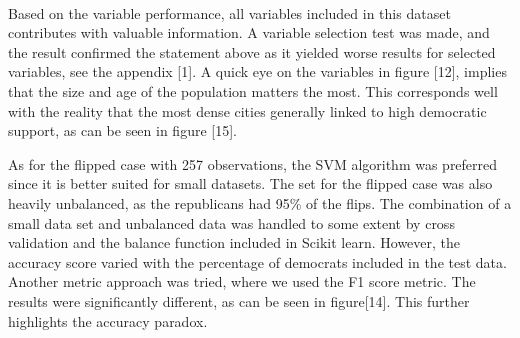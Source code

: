 \\
\par
Based on the variable performance, all variables included in this dataset contributes with valuable information. A variable selection test was made, and the result confirmed the statement above as it yielded worse results for selected variables, see the appendix [1]. A quick eye on the variables in figure [12], implies that the size and age of the population matters the most. This corresponds well with the reality that the most dense cities generally linked to high democratic support, as can be seen in figure [15].
\\
\par
As for the flipped case with 257 observations, the SVM algorithm was preferred since it is better suited for small datasets. The set for the flipped case was also heavily unbalanced, as the republicans had 95\% of the flips. The combination of a small data set and unbalanced data was handled to some extent by cross validation and the balance function included in Scikit learn. However, the accuracy score varied with the percentage of democrats included in the test data. Another metric approach was tried, where we used the F1 score metric. The results were significantly different, as can be seen in figure[14]. This further highlights the accuracy paradox.